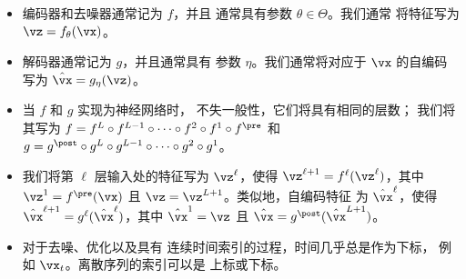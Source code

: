 \begin{itemize}
    \item 编码器和去噪器通常记为 \(f\)，并且
        通常具有参数 \(\theta \in \Theta\)。我们通常
        将特征写为 \(\vz = f_{\theta}(\vx)\)。
    \item 解码器通常记为 \(g\)，并且通常具有
        参数 \(\eta\)。我们通常将对应于 \(\vx\) 的自编码
        写为 \(\hat{\vx} = g_{\eta}(\vz)\)。
    \item 当 \(f\) 和 \(g\) 实现为神经网络时，
        不失一般性，它们将具有相同的层数；
        我们将其写为 \(f = f^{L} \circ f^{L - 1}
        \circ \cdots \circ f^{2} \circ f^{1} \circ f^{\pre}\) 和 \(g
            = g^{\post} \circ g^{L} \circ g^{ L - 1} \circ \cdots \circ
        g^{2} \circ g^{1}\)。
    \item 我们将第 \(\ell\) 层输入处的特征写为
        \(\vz^{\ell}\)，使得 \(\vz^{\ell + 1} =
        f^{\ell}(\vz^{\ell})\)，其中 \(\vz^{1} = f^{\pre}(\vx)\) 且
        \(\vz = \vz^{L + 1}\)。类似地，自编码特征
        为 \(\hat{\vx}^{\ell}\)，使得 \(\hat{\vx}^{\ell + 1} =
        g^{\ell}(\hat{\vx}^{\ell})\)，其中 \(\hat{\vx}^{1} = \vz\) 且
        \(\hat{\vx} = g^{\post}(\hat{\vx}^{L + 1})\)。
    \item 对于去噪、优化以及具有
        连续时间索引的过程，时间几乎总是作为下标，
        例如 \(\vx_{t}\)。离散序列的索引可以是
        上标或下标。
\end{itemize}